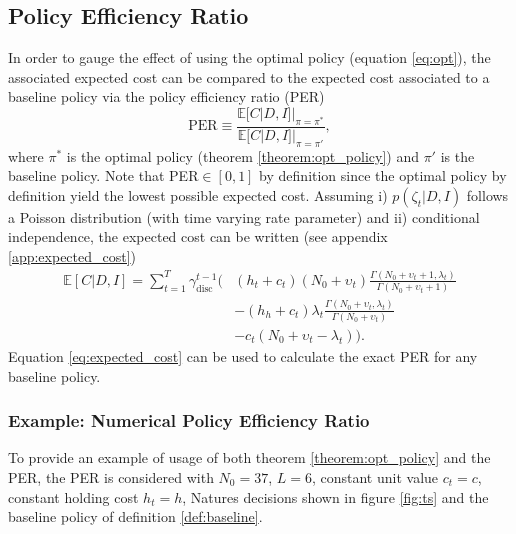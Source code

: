 \documentclass[a4paper,12pt]{article}
\begin{document}
	\subsection{Policy Efficiency Ratio}
	In order to gauge the effect of using the optimal policy (equation \eqref{eq:opt}), the associated expected cost can be compared to the expected cost associated to a baseline policy via the policy efficiency ratio (PER)
	\begin{equation}
		\text{PER}\equiv \frac{\mathbb{E}[C|D,I]|_{\pi=\pi^*}}{\mathbb{E}[C|D,I]|_{\pi=\pi'}},
		\label{eq:per_def}
	\end{equation}
	where $\pi^*$ is the optimal policy (theorem \ref{theorem:opt_policy}) and $\pi'$ is the baseline policy. Note that PER$\in [0,1]$ by definition since the optimal policy by definition yield the lowest possible expected cost. Assuming i) $p(\zeta_t|D,I)$ follows a Poisson distribution (with time varying rate parameter) and ii) conditional independence, the expected cost can be written (see appendix \ref{app:expected_cost})
	\begin{equation}
		\begin{split}
			\mathbb{E}[C|D,I] = \sum_{t=1}^{T} \gamma_{\text{disc}}^{t-1} \bigg(& 
			(h_t+c_t)(N_0 + \upsilon_t)\frac{\Gamma(N_0+\upsilon_t+1,\lambda_t)}{\Gamma(N_0+\upsilon_t+1)}\\&- (h_h+c_t)\lambda_t \frac{\Gamma(N_0+\upsilon_t,\lambda_t)}{\Gamma(N_0+\upsilon_t)}\\
			&- c_t(N_0 + \upsilon_t-\lambda_t)\bigg).
		\end{split}
		\label{eq:expected_cost}
	\end{equation}
	Equation \eqref{eq:expected_cost} can be used to calculate the exact PER for any baseline policy.
	
	\subsubsection{Example: Numerical Policy Efficiency Ratio}
	To provide an example of usage of both theorem \ref{theorem:opt_policy} and the PER, the PER is considered with $N_0=37$, $L=6$, constant unit value $c_t=c$, constant holding cost $h_t=h$, Natures decisions shown in figure \ref{fig:ts} and the baseline policy of definition \ref{def:baseline}.
	
\end{document}
